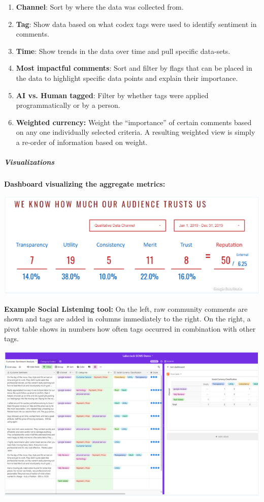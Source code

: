 \begin{enumerate}
\def\labelenumi{\arabic{enumi}.}
\tightlist
\item
  \textbf{Channel}: Sort by where the data was collected from.
\item
  \textbf{Tag}: Show data based on what codex tags were used to identify
  sentiment in comments.
\item
  \textbf{Time}: Show trends in the data over time and pull specific
  data-sets.
\item
  \textbf{Most impactful comments}: Sort and filter by flags that can be
  placed in the data to highlight specific data points and explain their
  importance.
\item
  \textbf{AI vs. Human tagged}: Filter by whether tags were applied
  programmatically or by a person.
\item
  \textbf{Weighted currency:} Weight the ``importance'' of certain
  comments based on any one individually selected criteria. A resulting
  weighted view is simply a re-order of information based on weight.
\end{enumerate}

\hypertarget{visualizations}{%
\subparagraph{Visualizations}\label{visualizations}}

\textbf{Dashboard visualizing the aggregate metrics:}

\includegraphics{images/social-listening_dashboard.png}

\textbf{Example Social Listening tool:} On the left, raw community
comments are shown and tags are added in columns immediately to the
right. On the right, a pivot table shows in numbers how often tags
occurred in combination with other tags.

\includegraphics{images/social-listening_tool-example.png}

